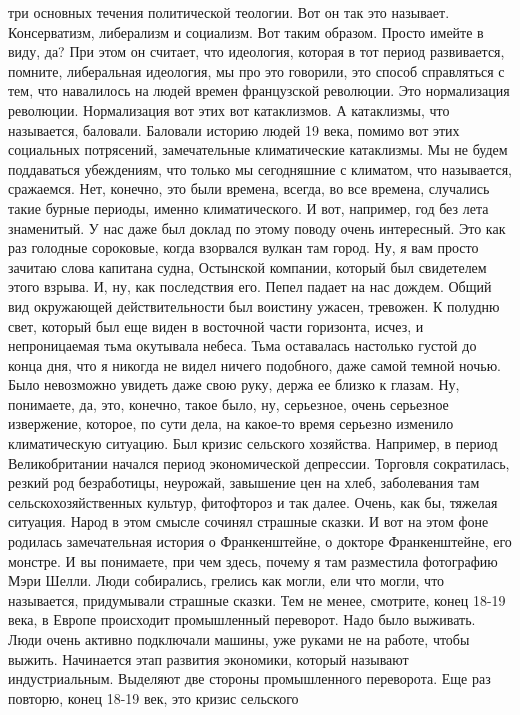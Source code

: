 три основных течения политической теологии. Вот он так это называет.
Консерватизм, либерализм и социализм. Вот таким образом. Просто имейте в виду,
да? При этом он считает, что идеология, которая в тот период развивается,
помните, либеральная идеология, мы про это говорили, это способ справляться с
тем, что навалилось на людей времен французской революции. Это нормализация
революции. Нормализация вот этих вот катаклизмов. А катаклизмы, что называется,
баловали. Баловали историю людей 19 века, помимо вот этих социальных потрясений,
замечательные климатические катаклизмы. Мы не будем поддаваться убеждениям, что
только мы сегодняшние с климатом, что называется, сражаемся. Нет, конечно, это
были времена, всегда, во все времена, случались такие бурные периоды, именно
климатического. И вот, например, год без лета знаменитый. У нас даже был доклад
по этому поводу очень интересный. Это как раз голодные сороковые, когда
взорвался вулкан там город. Ну, я вам просто зачитаю слова капитана судна,
Остынской компании, который был свидетелем этого взрыва. И, ну, как последствия
его. Пепел падает на нас дождем. Общий вид окружающей действительности был
воистину ужасен, тревожен. К полудню свет, который был еще виден в восточной
части горизонта, исчез, и непроницаемая тьма окутывала небеса. Тьма оставалась
настолько густой до конца дня, что я никогда не видел ничего подобного, даже
самой темной ночью. Было невозможно увидеть даже свою руку, держа ее близко к
глазам. Ну, понимаете, да, это, конечно, такое было, ну, серьезное, очень
серьезное извержение, которое, по сути дела, на какое-то время серьезно изменило
климатическую ситуацию. Был кризис сельского хозяйства. Например, в период
Великобритании начался период экономической депрессии. Торговля сократилась,
резкий род безработицы, неурожай, завышение цен на хлеб, заболевания там
сельскохозяйственных культур, фитофтороз и так далее. Очень, как бы, тяжелая
ситуация. Народ в этом смысле сочинял страшные сказки. И вот на этом фоне
родилась замечательная история о Франкенштейне, о докторе Франкенштейне, его
монстре. И вы понимаете, при чем здесь, почему я там разместила фотографию Мэри
Шелли. Люди собирались, грелись как могли, ели что могли, что называется,
придумывали страшные сказки. Тем не менее, смотрите, конец 18-19 века, в Европе
происходит промышленный переворот. Надо было выживать. Люди очень активно
подключали машины, уже руками не на работе, чтобы выжить. Начинается этап
развития экономики, который называют индустриальным. Выделяют две стороны
промышленного переворота. Еще раз повторю, конец 18-19 век, это кризис сельского
